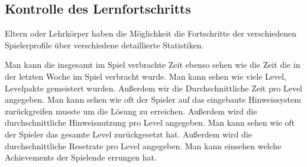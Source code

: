 \subsection{Kontrolle des Lernfortschritts}

\begin{requirements}
	Eltern oder Lehrkörper haben die Möglichkeit die Fortschritte der verschiedenen Spielerprofile über verschiedene detaillierte Statistiken.
	\begin{requirements}
		 Man kann die insgesamt im Spiel verbrachte Zeit ebenso sehen wie die Zeit die in der letzten Woche im Spiel verbracht wurde. 
		 Man kann sehen wie viele Level, Levelpakte gemeistert wurden. Außerdem wir die Durchschnittliche Zeit pro Level angegeben.
		 Man kann sehen wie oft der Spieler auf das eingebaute Hinweissystem zurückgreifen musste um die Lösung zu erreichen. Außerdem wird die durchschnittliche Hinweisnutzung pro Level angegeben.
		 Man kann sehen wie oft der Spieler das gesamte Level zurückgesetzt hat. Außerdem wird die durchschnittliche Resetrate pro Level angegeben.
		 Man kann einsehen welche Achievements der Spielende errungen hat.
	\end{requirements}
\end{requirements}


